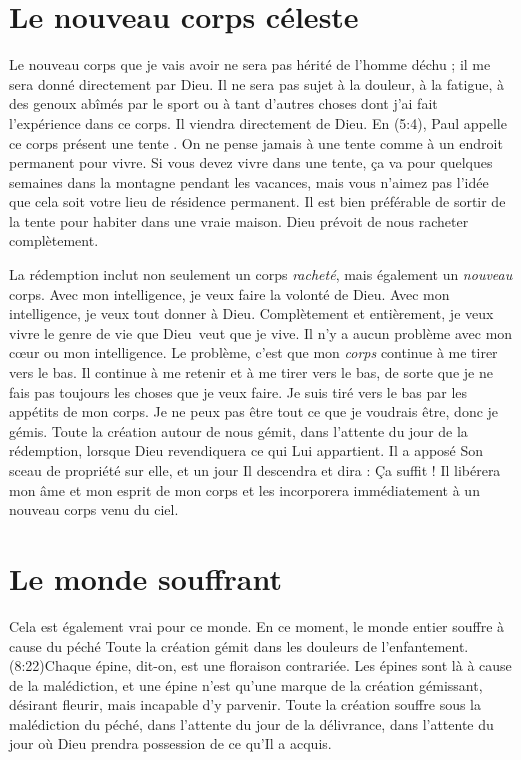 \section{Le nouveau corps c\'eleste}

Le nouveau corps que je vais avoir ne sera pas hérité de l'homme déchu ;
 il me sera donné directement par Dieu.
 Il ne sera pas sujet à la douleur, à la fatigue, à des genoux abîmés
 par le sport ou à tant d'autres choses dont j'ai fait l'expérience
  dans ce corps. Il viendra directement de Dieu.
 En (5:4), Paul appelle ce corps présent une \Og tente \Fg{}.
 On ne pense jamais à une tente comme à un endroit permanent pour vivre.
 Si vous devez vivre dans une tente, ça va pour quelques semaines
 dans la montagne pendant les vacances, mais vous n'aimez pas l'idée
 que cela soit votre lieu de résidence permanent.
 Il est bien préférable de sortir de la tente pour habiter dans une vraie maison.
 Dieu prévoit de nous racheter complètement.

La rédemption inclut non seulement un corps \emph{racheté}, mais également
 un \emph{nouveau} corps. Avec mon intelligence, je veux faire la volonté de Dieu.
 Avec mon intelligence, je veux tout donner à Dieu.
 Complètement et entièrement, je veux vivre le genre de vie que Dieu~veut
 que je vive. Il n'y a aucun problème avec mon cœur ou mon intelligence.
 Le problème, c'est que mon \emph{corps} continue à me tirer vers le bas.
 Il continue à me retenir et à me tirer vers le bas, de sorte que je ne fais pas toujours
 les choses que je veux faire. Je suis tiré vers le bas par les appétits
 de mon corps. Je ne peux pas être tout ce que je voudrais être,
 donc je gémis. Toute la création autour de nous gémit,
 dans l'attente du jour de la rédemption, lorsque Dieu revendiquera ce qui Lui appartient.
 Il a apposé Son sceau de propriété sur elle, et un jour Il descendra
 et dira : \Og Ça suffit ! \Fg{}
 Il libérera mon âme et mon esprit de mon corps et les incorporera
 immédiatement à un nouveau corps venu du ciel.


\section{Le monde souffrant}

Cela est également vrai pour ce monde.
 En ce moment, le monde entier souffre à cause du péché\frcolon{}
 \Og Toute la création gémit dans les douleurs de l'enfantement. \Fg{}
 (8:22)Chaque épine, dit-on,
 est une floraison contrariée.
 Les épines sont là à cause de la malédiction, et une épine n'est qu'une 
 marque de la création gémissant, désirant fleurir, mais incapable
 d'y parvenir. Toute la création souffre sous la malédiction du péché,
 dans l'attente du jour de la délivrance, dans l'attente du jour
 où Dieu prendra possession de ce qu'Il a acquis.

